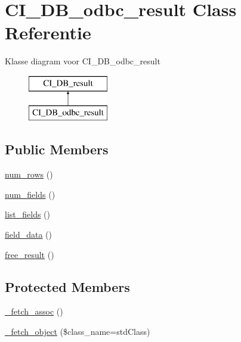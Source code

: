 \hypertarget{class_c_i___d_b__odbc__result}{}\section{C\+I\+\_\+\+D\+B\+\_\+odbc\+\_\+result Class Referentie}
\label{class_c_i___d_b__odbc__result}
Klasse diagram voor C\+I\+\_\+\+D\+B\+\_\+odbc\+\_\+result\begin{figure}[H]
\begin{center}
\leavevmode
\includegraphics[height=2.000000cm]{class_c_i___d_b__odbc__result}
\end{center}
\end{figure}
\subsection*{Public Members}
\begin{DoxyCompactItemize}
\item 
\mbox{\hyperlink{class_c_i___d_b__odbc__result_a218657c303ee499b97710ab0cd2f5d6e}{num\+\_\+rows}} ()
\item 
\mbox{\hyperlink{class_c_i___d_b__odbc__result_af831bf363e4d7d661a717a4932af449d}{num\+\_\+fields}} ()
\item 
\mbox{\hyperlink{class_c_i___d_b__odbc__result_a50b54eb4ea7cfd039740f532988ea776}{list\+\_\+fields}} ()
\item 
\mbox{\hyperlink{class_c_i___d_b__odbc__result_a84bffd65e53902ade1591716749a33e3}{field\+\_\+data}} ()
\item 
\mbox{\hyperlink{class_c_i___d_b__odbc__result_aad2d98d6beb3d6095405356c6107b473}{free\+\_\+result}} ()
\end{DoxyCompactItemize}
\subsection*{Protected Members}
\begin{DoxyCompactItemize}
\item 
\mbox{\hyperlink{class_c_i___d_b__odbc__result_a43a9a92817f1334a1c10752ec44275a0}{\+\_\+fetch\+\_\+assoc}} ()
\item 
\mbox{\hyperlink{class_c_i___d_b__odbc__result_a60806be6a9c2488820813c2a7f4fef71}{\+\_\+fetch\+\_\+object}} (\$class\+\_\+name=\textquotesingle{}std\+Class\textquotesingle{})
\end{DoxyCompactItemize}
